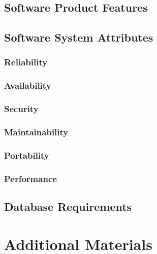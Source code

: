 \documentclass[a4paper, 12pt]{article}
\begin{document}
	\subsection{Software Product Features}
	\subsection{Software System Attributes}
		\subsubsection{Reliability}
		\subsubsection{Availability}
		\subsubsection{Security}
		\subsubsection{Maintainability}
		\subsubsection{Portability}
		\subsubsection{Performance}
	\subsection{Database Requirements}

\section{Additional Materials}
\end{document}
